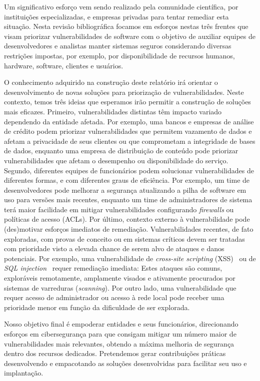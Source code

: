 Um significativo esforço vem sendo realizado pela comunidade científica, por instituições especializadas, e empresas privadas para tentar remediar esta situação. Nesta revisão bibliográfica focamos em esforços nestas três frentes que visam priorizar vulnerabilidades de software com o objetivo de auxiliar equipes de desenvolvedores e analistas manter sistemas seguros considerando diversas restrições impostas, por exemplo, por disponibilidade de recursos humanos, hardware, software, clientes e usuários.

O conhecimento adquirido na construção deste relatório irá orientar o desenvolvimento de novas soluções para priorização de vulnerabilidades. Neste contexto, temos três ideias que esperamos irão permitir a construção de soluções mais eficazes.  Primeiro, vulnerabilidades distintas têm impacto variado dependendo da entidade afetada. Por exemplo, uma bancos e empresas de análise de crédito podem priorizar vulnerabilidades que permitem vazamento de dados e afetam a privacidade de seus clientes ou que comprometam a integridade de bases de dados, enquanto uma empresa de distribuição de conteúdo pode priorizar vulnerabilidades que afetam o desempenho ou disponibilidade do serviço. Segundo, diferentes equipes de funcionários podem solucionar vulnerabilidades de diferentes formas, e com diferentes graus de eficiência. Por exemplo, um time de desenvolvedores pode melhorar a segurança atualizando a pilha de software em uso para versões mais recentes, enquanto um time de administradores de sistema terá maior facilidade em mitigar vulnerabilidades configurando \emph{firewalls} ou políticas de acesso (ACLs). Por último, contexto externo à vulnerabilidade pode (des)motivar esforços imediatos de remediação. Vulnerabilidades recentes, de fato exploradas, com provas de conceito ou em sistemas críticos devem ser tratadas com prioridade visto a elevada chance de serem alvo de ataques e danos potenciais. Por exemplo, uma vulnerabilidade de \emph{cross-site scripting} (XSS)~\cite{hydara15xss} ou de \emph{SQL injection}~\cite{nasereddin23sqlinject} requer remediação imediata: Estes ataques são comuns, exploráveis remotamente, amplamente visados e ativamente procurados por sistemas de varreduras (\emph{scanning}). Por outro lado, uma vulnerabilidade que requer acesso de administrador ou acesso à rede local pode receber uma prioridade menor em função da dificuldade de ser explorada.

Nosso objetivo final é empoderar entidades e seus funcionários, direcionando esforços em cibersegurança para que consigam mitigar um número maior de vulnerabilidades mais relevantes, obtendo a máxima melhoria de segurança dentro dos recursos dedicados. Pretendemos gerar contribuições práticas desenvolvendo e empacotando as soluções desenvolvidas para facilitar seu uso e implantação.

